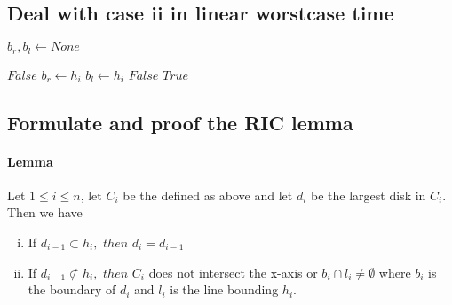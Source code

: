 \documentclass{article}
\begin{document}
\newpage
\subsection{Deal with case ii in linear worstcase time}
\begin{algorithmic}[1]
		\State
		$b_r, b_l \gets None$

				\State
				\Return $False$
			\EndIf
			\State
			\State
				$b_r \gets h_i$
			\EndIf
			\State
				$b_l \gets h_i$
			\EndIf
				\State
				\Return $False$
			\EndIf
		\EndFor
		\State
		\Return $True$
	\EndFunction
\end{algorithmic}
\subsection{Formulate and proof the RIC lemma}
\paragraph{Lemma}
Let $1 \leq i \leq n$, let $C_i$ be the defined as above and let $d_i$ be
the largest disk in $C_i$. Then we have
\begin{enumerate}[(i)]
	\item If $d_{i-1} \subset h_i,$ $then$ $d_i = d_{i-1}$
	\item If $d_{i-1} \not\subset h_{i},$ $then$ $C_i$ does not intersect the x-axis
		or $b_i \cap l_i \neq \emptyset$ where $b_i$ is the boundary of $d_i$ and $l_i$
		is the line bounding $h_i$.
\end{enumerate}
\end{document}
